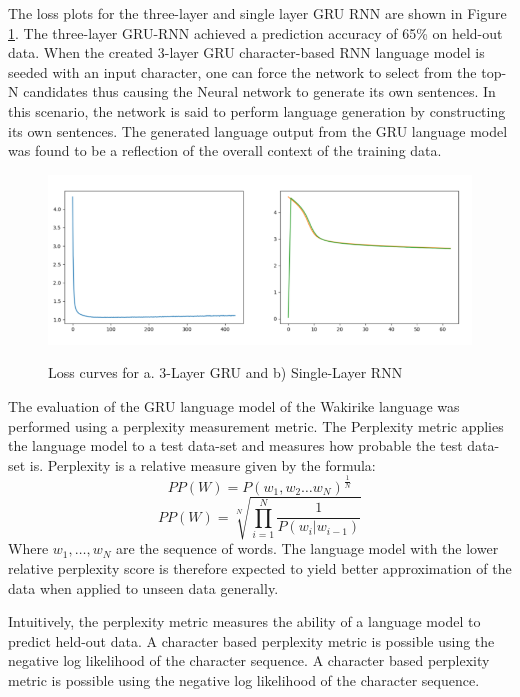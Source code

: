 The loss plots for the three-layer and single layer GRU RNN are shown in Figure \ref{fig_ch7_00losses}.  The three-layer GRU-RNN achieved a prediction accuracy of 65\% on held-out data.  When the created 3-layer GRU character-based RNN language model is seeded with an input character, one can force the network to select from the top-N candidates thus causing the Neural network to generate its own sentences.  In this scenario, the network is said to perform language generation by constructing its own sentences.  The generated language output from the GRU language model was found to be a reflection of the overall context of the training data. 

\begin{figure}
\centering
  \includegraphics[width=14cm]{thesis/images/losses_slgru}\\
  \caption{Loss curves for a. 3-Layer GRU and b) Single-Layer RNN} \label{fig_ch7_00losses}
\end{figure}

The evaluation of the GRU language model of the Wakirike language was performed using a perplexity measurement metric. The Perplexity metric applies the language model to a test data-set and measures how probable the test data-set is. Perplexity is a relative measure given by the formula:
%
\begin{equation}
PP(W)=P(w_1,w_2\dots w_N)^\frac{1}{N}
\label{ch5_eq1_ppx}
\end{equation}
%
%
\begin{equation}
PP(W)=\sqrt[N]{\prod_{i=1}^N\frac{1}{P(w_i|w_{i-1})}}
\label{ch5_eq2_ppx}
\end{equation}
%
Where $w_1,\dots,w_N$ are the sequence of words. The language model with the lower relative perplexity score is therefore expected to yield better approximation of the data when applied to unseen data generally.

Intuitively, the perplexity metric measures the ability of a language model to predict held-out data.  A character based perplexity metric is possible using  the negative log likelihood of the character sequence.  A character based perplexity metric is possible using  the negative log likelihood of the character sequence.

